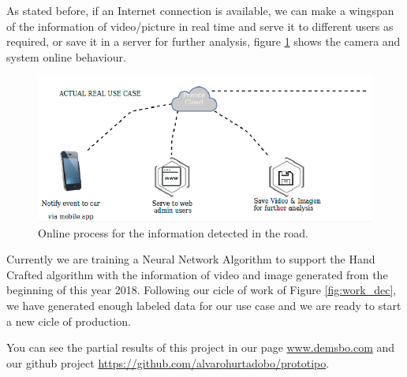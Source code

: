 As stated before, if an Internet connection is available, we can make a wingspan of the information of video/picture in real time and serve it to different users as required, or save it in a server for further analysis, figure \ref{fig:online} shows the camera and system online behaviour.


\begin{figure}[t]\centering
	\includegraphics[width=\linewidth]{images/online}
	\caption{Online process for the information detected in the road. }
	\label{fig:online}
\end{figure}

Currently we are training a Neural Network Algorithm to support the Hand Crafted algorithm with the information of video and image generated from the beginning of this year 2018. Following our cicle of work of Figure \ref{fig:work_dec}, we have generated enough labeled data for our use case and we are ready to start a new cicle of production.

You can see the partial results of this project in our page \href{www.demsbo.com}{www.demsbo.com} and our github project \href{https://github.com/alvarohurtadobo/prototipo}{https://github.com/alvarohurtadobo/prototipo}.

